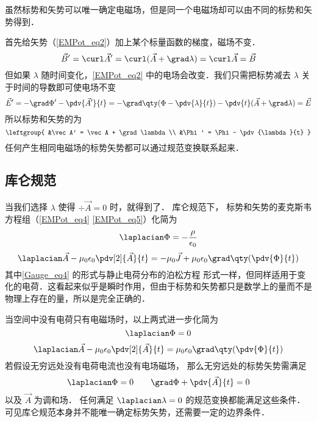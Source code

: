 
虽然标势和矢势可以唯一确定电磁场，但是同一个电磁场却可以由不同的标势和矢势得到．

首先给矢势（\autoref{EMPot_eq2}）加上某个标量函数的梯度，磁场不变．
\begin{equation}
\vec B' = \curl \vec A' = \curl (\vec A + \grad \lambda) = \curl \vec A = \vec B
\end{equation}
但如果 $\lambda$ 随时间变化，\autoref{EMPot_eq2} 中的电场会改变．我们只需把标势减去 $\lambda$ 关于时间的导数即可使电场不变
\begin{equation}
\vec E' = -\grad \Phi' - \pdv{\vec A'}{t} = -\grad \qty(\Phi - \pdv{\lambda}{t}) - \pdv{t} (\vec A + \grad \lambda) = \vec E
\end{equation}
所以标势和矢势的为
\begin{equation}
\leftgroup{
&\vec A' = \vec A + \grad \lambda\\
&\Phi' = \Phi - \pdv{\lambda}{t}
}\end{equation}
任何产生相同电磁场的标势矢势都可以通过规范变换联系起来．

\subsection{库仑规范}
当我们选择 $\lambda$ 使得 $\div \vec A = 0$ 时，就得到了． 库仑规范下， 标势和矢势的麦克斯韦方程组（\autoref{EMPot_eq4} \autoref{EMPot_eq5}）化简为
\begin{equation}\label{Gauge_eq4}
\laplacian \Phi = -\frac{\rho}{\epsilon_0}
\end{equation}
\begin{equation}\label{Gauge_eq5}
\laplacian \vec A - \mu_0\epsilon_0 \pdv[2]{\vec A}{t} = -\mu_0\vec J + \mu_0\epsilon_0 \grad\qty(\pdv{\Phi}{t})
\end{equation}
其中\autoref{Gauge_eq4} 的形式与静止电荷分布的泊松方程%
形式一样，但同样适用于变化的电荷．这看起来似乎是瞬时作用，但由于标势和矢势都只是数学上的量而不是物理上存在的量，所以是完全正确的．

当空间中没有电荷只有电磁场时，以上两式进一步化简为
\begin{equation}
\laplacian \Phi = 0
\end{equation}
\begin{equation}\label{Gauge_eq5}
\laplacian \vec A - \mu_0\epsilon_0 \pdv[2]{\vec A}{t} = \mu_0\epsilon_0 \grad\qty(\pdv{\Phi}{t})
\end{equation}
若假设无穷远处没有电荷电流也没有电场磁场， 那么无穷远处的标势矢势需满足
\begin{equation}
\laplacian \Phi = 0 \qquad
\grad \Phi + \pdv{\vec A}{t} = 0
\end{equation}
以及 $\vec A$ 为调和场． 任何满足 $\laplacian \lambda = 0$ 的规范变换都能满足这些条件． 可见库仑规范本身并不能唯一确定标势矢势，还需要一定的边界条件．

